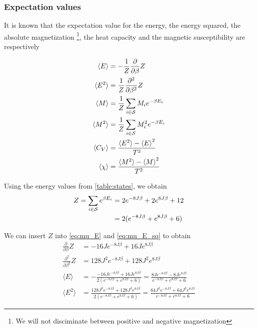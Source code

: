 \documentclass[a4paper]{article}
\begin{document}
\subsubsection{Expectation values}

It is known that the expectation value for the energy, the energy squared, the absolute magnetization \footnote{We will not disciminate between positive and negative magnetization}, the heat capacity and the magnetic susceptibility are respectively

\begin{align}
    \langle E \rangle &= - \frac{1}{Z} \frac{\partial }{\partial \beta} Z \label{eq:mu_E} \\
    \langle E^2 \rangle &= \frac{1}{Z} \frac{\partial^2}{\partial \beta^2} Z \label{eq:mu_E_sq}\\
    \langle M \rangle &= \frac{1}{Z} \sum_{i \in {\mathcal{S}}} M_i e^{-\beta E_i} \label{eq:mu_M}\\
    \langle M^2 \rangle &= \frac{1}{Z} \sum_{i \in {\mathcal{S}}} M_i^2 e^{-\beta E_i} \label{eq:mu_M_sq}\\
    \langle C_V \rangle &= \frac{\langle E^2 \rangle - {\langle E \rangle}^2}{T^2} \label{eq:mu_C_V}\\
    \langle \chi \rangle &= \frac{\langle M^2 \rangle - {\langle M \rangle}^2}{T^2} \label{eq:mu_chi}
\end{align}

Using the energy values from \vref{table:states}, we obtain
\begin{align}
    Z = \sum_{i \in {\mathcal{S}}}e^{\beta E_i}
    &= 2e^{-8 J \beta} + 2e^{8 J \beta} + 12  \nonumber \\
    &= 2(e^{-8 J \beta} + e^{8 J \beta} + 6)
\end{align}

We can insert $Z$ into \vref{eq:mu_E} and \vref{eq:mu_E_sq} to obtain
\begin{align}
    \frac{\partial }{\partial \beta} Z &= -16J e^{-8 J \beta} + 16J e^{8J \beta} \\
    \frac{\partial^2}{\partial \beta^2} Z &= 128J^2 e^{-8 J \beta} + 128J^2 e^{8J \beta} \\
    \langle E \rangle &= - \frac{-16J e^{-8 J \beta} + 16J e^{8J \beta}}{2(e^{-8 J \beta} + e^{8 J \beta} + 6)}
    =  \frac{8J e^{-8 J \beta} - 8J e^{8J \beta}}{ e^{-8 J \beta} + e^{8 J \beta} + 6} \label{eq:mu_E:2} \\
    \langle E^2 \rangle &= \frac{128J^2 e^{-8 J \beta} + 128J^2 e^{8J \beta}}{2(e^{-8 J \beta} + e^{8 J \beta} + 6)}
    = \frac{64J^2 e^{-8 J \beta} + 64J^2 e^{8J \beta}}{e^{-8 J \beta} + e^{8 J \beta} + 6} \label{eq:mu_E_sq:2}
\end{align}
\end{document}
